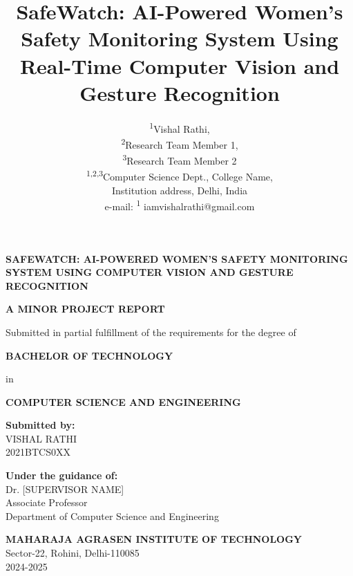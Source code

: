 \documentclass[12pt,a4paper]{article}
\title{SafeWatch: AI-Powered Women's Safety Monitoring System Using Real-Time Computer Vision and Gesture Recognition}
\author{%
    \begin{tabular}{c}
        \textsuperscript{1}Vishal Rathi, \\
        \textsuperscript{2}Research Team Member 1, \\
        \textsuperscript{3}Research Team Member 2 \\[6pt]
        \textsuperscript{1,2,3}Computer Science Dept., College Name, \\ 
        Institution address, Delhi, India \\[6pt]
        e-mail: \textsuperscript{1} iamvishalrathi@gmail.com \\
    \end{tabular}%
}
\date{} %
\begin{document}
\justifying

\begin{titlepage}
\centering

\vspace*{1cm}

{\fontsize{18}{22}\bfseries
SAFEWATCH: AI-POWERED WOMEN'S SAFETY MONITORING SYSTEM USING COMPUTER VISION AND GESTURE RECOGNITION
}

\vspace{1.5cm}

{\fontsize{14}{17}\bfseries
A MINOR PROJECT REPORT
}

\vspace{0.5cm}

{\fontsize{12}{15}\selectfont
Submitted in partial fulfillment of the requirements for the degree of
}

\vspace{0.5cm}

{\fontsize{14}{17}\bfseries
BACHELOR OF TECHNOLOGY
}

\vspace{0.5cm}

{\fontsize{12}{15}\selectfont
in
}

\vspace{0.5cm}

{\fontsize{14}{17}\bfseries
COMPUTER SCIENCE AND ENGINEERING
}

\vspace{1.5cm}

{\fontsize{12}{15}\selectfont
\textbf{Submitted by:}\\
\vspace{0.5cm}
VISHAL RATHI\\
2021BTCS0XX\\
}

\vspace{1.5cm}

{\fontsize{12}{15}\selectfont
\textbf{Under the guidance of:}\\
\vspace{0.5cm}
Dr. [SUPERVISOR NAME]\\
Associate Professor\\
Department of Computer Science and Engineering\\
}

\vspace{2cm}

{\fontsize{12}{15}\selectfont
\textbf{MAHARAJA AGRASEN INSTITUTE OF TECHNOLOGY}\\
Sector-22, Rohini, Delhi-110085\\
\vspace{0.5cm}
2024-2025
}

\end{titlepage}
\end{document}
